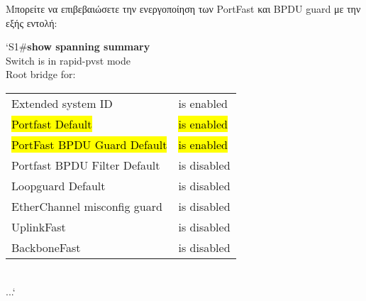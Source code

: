 \documentclass[eforms]{EdipyLabs} %
\begin{document}
Μπορείτε να επιβεβαιώσετε την ενεργοποίηση των PortFast και BPDU guard με την εξής εντολή:

\begin{CommandBox}
`S1\#\textbf{show spanning summary}\\
	Switch is in rapid-pvst mode\\
	Root bridge for:\\
	\begin{tabular}{ll}
		Extended system ID           & is enabled	\\
		\hl{Portfast Default}        & \hl{is enabled}	\\
		\hl{PortFast BPDU Guard Default}  & \hl{is enabled}	\\
		Portfast BPDU Filter Default & is disabled	\\
		Loopguard Default            & is disabled	\\
		EtherChannel misconfig guard & is disabled	\\
		UplinkFast                   & is disabled	\\
		BackboneFast                 & is disabled	\\
	\end{tabular}\\[0.25cm]
	...`
\end{CommandBox}   
\end{document}
